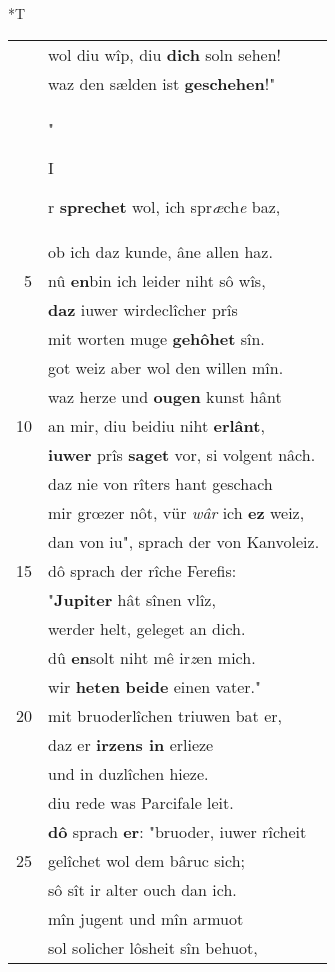 \documentclass[8pt,a4paper,notitlepage]{article}
\begin{document}
\begin{table}[ht]
\begin{minipage}[t]{0.5\linewidth}
\small
\begin{center}*T
\end{center}
\begin{tabular}{rl}
 & wol diu wîp, diu \textbf{dich} soln sehen!\\ 
 & waz den sælden ist \textbf{geschehen}!"\\ 
 & "\begin{large}I\end{large}r \textbf{sprechet} wol, ich spr\textit{æ}ch\textit{e} baz,\\ 
 & ob ich daz kunde, âne allen haz.\\ 
5 & nû \textbf{en}bin ich leider niht sô wîs,\\ 
 & \textbf{daz} iuwer wirdeclîcher prîs\\ 
 & mit worten muge \textbf{gehôhet} sîn.\\ 
 & got weiz aber wol den willen mîn.\\ 
 & waz herze und \textbf{ougen} kunst hânt\\ 
10 & an mir, diu beidiu niht \textbf{erlânt},\\ 
 & \textbf{iuwer} prîs \textbf{saget} vor, si volgent nâch.\\ 
 & daz nie von rîters hant geschach\\ 
 & mir grœzer nôt, vür \textit{wâr} ich \textbf{ez} weiz,\\ 
 & dan von iu", sprach der von Kanvoleiz.\\ 
15 & dô sprach der rîche Ferefis:\\ 
 & "\textbf{Jupiter} hât sînen vlîz,\\ 
 & werder helt, geleget an dich.\\ 
 & dû \textbf{en}solt niht mê ir\textit{z}en mich.\\ 
 & wir \textbf{heten} \textbf{beide} einen vater."\\ 
20 & mit bruoderlîchen triuwen bat er,\\ 
 & daz er \textbf{irzens in} erlieze\\ 
 & und in duzlîchen hieze.\\ 
 & diu rede was Parcifale leit.\\ 
 & \textbf{dô} sprach \textbf{er}: "bruoder, iuwer rîcheit\\ 
25 & gelîchet wol dem bâruc sich;\\ 
 & sô sît ir alter ouch dan ich.\\ 
 & mîn jugent und mîn armuot\\ 
 & sol solicher lôsheit sîn behuot,\\ 

\end{tabular}
\end{minipage}
\end{table}
\end{document}
